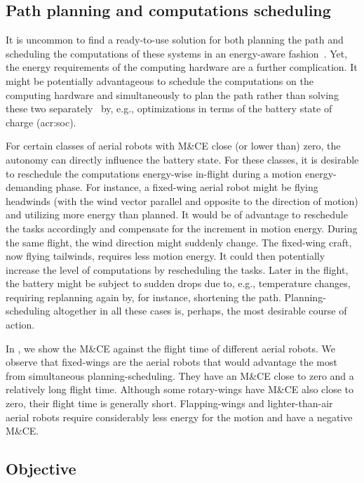 \subsection{Path planning and computations scheduling}

It is uncommon to find a ready-to-use solution for both planning the path and scheduling the computations of these systems in an energy-aware fashion~\citep{brateman2006energy,sudhakar2020balancing}. Yet, the energy requirements of the computing hardware are a further complication. It might be potentially advantageous to schedule the computations on the computing hardware and simultaneously to plan the path rather than solving these two separately~\citep{lahijanian2018resource,ondruska2015scheduled} by, e.g., optimizations in terms of the battery state of charge (\Gls{acr:soc}). 

For certain classes of aerial robots with M\&CE close (or lower than) zero, the autonomy can directly influence the battery state. For these classes, it is desirable to reschedule the computations energy-wise in-flight during a motion energy-demanding phase. For instance, a fixed-wing aerial robot might be flying headwinds (with the wind vector parallel and opposite to the direction of motion) and utilizing more energy than planned. It would be of advantage to reschedule the tasks accordingly and compensate for the increment in motion energy. During the same flight, the wind direction might suddenly change. The fixed-wing craft, now flying tailwinds, requires less motion energy. It could then potentially increase the level of computations by rescheduling the tasks. Later in the flight, the battery might be subject to sudden drops due to, e.g., temperature changes, requiring replanning again by, for instance, shortening the path. Planning-scheduling altogether in all these cases is, perhaps, the most desirable course of action.

In , we show the M\&CE against the flight time of different aerial robots. We observe that fixed-wings are the aerial robots that would advantage the most from simultaneous planning-scheduling. They have an M\&CE close to zero and a relatively long flight time. Although some rotary-wings have M\&CE also close to zero, their flight time is generally short. Flapping-wings and lighter-than-air aerial robots require considerably less energy for the motion and have a negative M\&CE.

\subsection{Objective}
\label{sec:objective}

